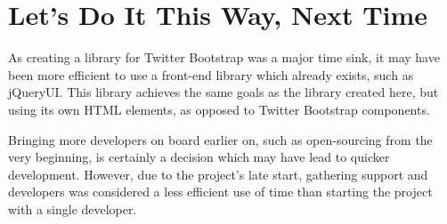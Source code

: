 \section{Let's Do It This Way, Next Time}
As creating a library for Twitter Bootstrap was a major time sink, it may have been more efficient to use a front-end library which already exists, such as jQueryUI. This library achieves the same goals as the library created here, but using its own HTML elements, as opposed to Twitter Bootstrap components.

Bringing more developers on board earlier on, such as open-sourcing from the very beginning, is certainly a decision which may have lead to quicker development. However, due to the project's late start, gathering support and developers was considered a less efficient use of time than starting the project with a single developer.




